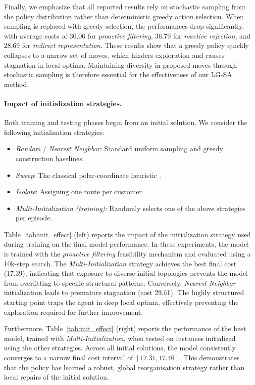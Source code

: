\documentclass[letterpaper]{article} %
\begin{document}
Finally, we emphasize that all reported results rely on stochastic sampling from the policy distribution rather than deterministic greedy action selection. When sampling is replaced with greedy selection, the performances drop significantly, with average costs of 30.06 for \textit{proactive filtering}, 36.79 for \textit{reactive rejection}, and 28.69 for \textit{indirect representation}. These results show that a greedy policy quickly collapses to a narrow set of moves, which hinders exploration and causes stagnation in local optima. Maintaining diversity in proposed moves through stochastic sampling is therefore essential for the effectiveness of our LG-SA method.


\paragraph{Impact of initialization strategies.}

Both training and testing phases begin from an initial solution. We consider the following initialization strategies:

\begin{itemize}
    \item \textit{Random} / \textit{Nearest Neighbor}: Standard uniform sampling and greedy construction baselines.
    \item \textit{Sweep}: The classical polar-coordinate heuristic \cite{gillett_heuristic_1974}.
    \item \textit{Isolate}: Assigning one route per customer.
    \item \textit{Multi-Initialization (training):} Randomly selects one of the above strategies per episode.
\end{itemize}


Table~\ref{tab:init_effect} (left) reports the impact of the initialization strategy used during training on the final model performance. In these experiments, the model is trained with the \textit{proactive filtering} feasibility mechanism and evaluated using a 10k-step search. The \textit{Multi-Initialization} strategy achieves the best final cost (17.39), indicating that exposure to diverse initial topologies prevents the model from overfitting to specific structural patterns. 
Conversely, \textit{Nearest Neighbor} initialization leads to premature stagnation (cost 29.61). The highly structured starting point traps the agent in deep local optima, effectively preventing the exploration required for further improvement.

Furthermore, Table~\ref{tab:init_effect} (right) reports the performance of the best model, trained with \textit{Multi-Initialization}, when tested on instances initialized using the other strategies. Across all initial solutions, the model consistently converges to a narrow final cost interval of $[17.31, 17.46]$. 
This demonstrates that the policy has learned a robust, global reorganisation strategy rather than local repairs of the initial solution.
\end{document}
